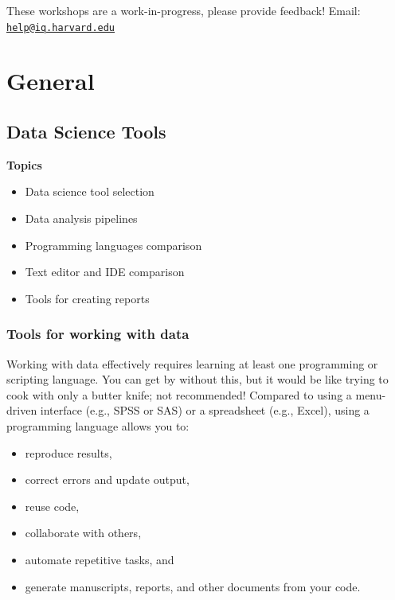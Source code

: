 \documentclass[]{book}
\providecommand{\tightlist}{%
  \setlength{\itemsep}{0pt}\setlength{\parskip}{0pt}}
\begin{document}
These workshops are a work-in-progress, please provide feedback! Email: \href{mailto:help@iq.harvard.edu}{\nolinkurl{help@iq.harvard.edu}}

\hypertarget{part-general}{%
\part{General}\label{part-general}}

\hypertarget{data-science-tools}{%
\chapter{Data Science Tools}\label{data-science-tools}}

\textbf{Topics}

\begin{itemize}
\tightlist
\item
  Data science tool selection
\item
  Data analysis pipelines
\item
  Programming languages comparison
\item
  Text editor and IDE comparison
\item
  Tools for creating reports
\end{itemize}

\hypertarget{tools-for-working-with-data}{%
\section{Tools for working with data}\label{tools-for-working-with-data}}

Working with data effectively requires learning at least one programming or scripting language. You can get by without this, but it would be like trying to cook with only a butter knife; not recommended! Compared to using a menu-driven interface (e.g., SPSS or SAS) or a spreadsheet (e.g., Excel), using a programming language allows you to:

\begin{itemize}
\tightlist
\item
  reproduce results,
\item
  correct errors and update output,
\item
  reuse code,
\item
  collaborate with others,
\item
  automate repetitive tasks, and
\item
  generate manuscripts, reports, and other documents from your code.
\end{itemize}
\end{document}
